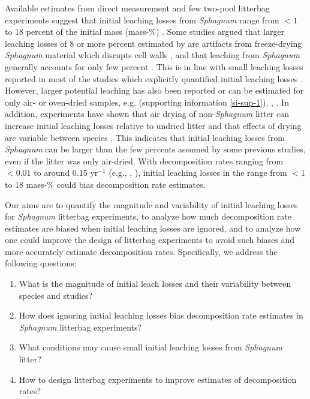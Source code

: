 \documentclass[bg, manuscript]{copernicus}
\begin{document}
Available estimates from direct measurement and few two-pool litterbag experiments suggest that initial leaching losses from \emph{Sphagnum} range from \(<1\) to 18 percent of the initial mass (mass-\%) \citep{Coulson.1978, Scheffer.2001, Moore.2001, Thormann.2002, Limpens.2003, Castells.2005, Moore.2007, DelGiudice.2017, Mastny.2018, Muller.2023}. Some studies argued that larger leaching losses of 8 or more percent estimated by \citet{Scheffer.2001} are artifacts from freeze-drying \emph{Sphagnum} material which disrupts cell walls \citep{Limpens.2003}, and that leaching from \emph{Sphagnum} generally accounts for only few percent \citep{Johnson.1991}. This is in line with small leaching losses reported in most of the studies which explicitly quantified initial leaching losses \citep{Coulson.1978, Moore.2001, Thormann.2002, Limpens.2003, Castells.2005, Mastny.2018}. However, larger potential leaching has also been reported or can be estimated for only air- or oven-dried samples, e.g. \citet{Moore.2007} (supporting information \ref{si-sup-1}), \citet{Thormann.2001}, \citet{Muller.2023}. In addition, experiments have shown that air drying of non-\emph{Sphagnum} litter can increase initial leaching losses relative to undried litter \citep{Gessner.1989, Barlocher.1997} and that effects of drying are variable between species \citep{Taylor.1996}. This indicates that initial leaching losses from \emph{Sphagnum} can be larger than the few percents assumed by some previous studies, even if the litter was only air-dried. With decomposition rates ranging from \(<0.01\) to around 0.15 yr\(^{-1}\) (e.g., \citet{Moore.2007}, \citet{Turetsky.2008}), initial leaching losses in the range from \(<1\) to 18 mass-\% could bias decomposition rate estimates.

Our aims are to quantify the magnitude and variability of initial leaching losses for \emph{Sphagnum} litterbag experiments, to analyze how much decomposition rate estimates are biased when initial leaching losses are ignored, and to analyze how one could improve the design of litterbag experiments to avoid such biases and more accurately estimate decomposition rates. Specifically, we address the following questions:

\begin{enumerate}
\def\labelenumi{\arabic{enumi}.}
\item
  What is the magnitude of initial leach losses and their variability between species and studies?
\item
  How does ignoring initial leaching losses bias decomposition rate estimates in \emph{Sphagnum} litterbag experiments?
\item
  What conditions may cause small initial leaching losses from \emph{Sphagnum} litter?
\item
  How to design litterbag experiments to improve estimates of decomposition rates?
\end{enumerate}
\end{document}
